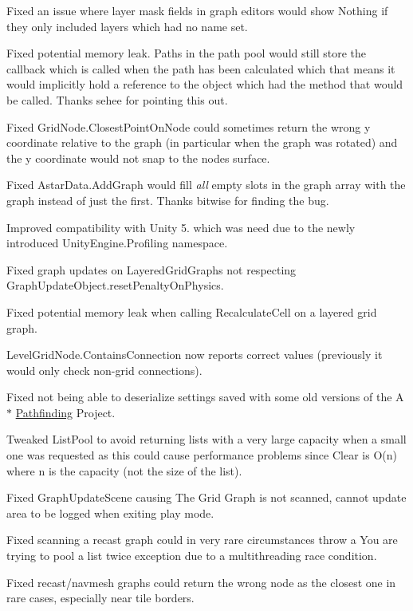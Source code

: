 \begin{DoxyItemize}
\begin{DoxyItemize}
\begin{DoxyItemize}
\item Fixed an issue where layer mask fields in graph editors would show \textquotesingle{}Nothing\textquotesingle{} if they only included layers which had no name set.
\item Fixed potential memory leak. Paths in the path pool would still store the callback which is called when the path has been calculated which that means it would implicitly hold a reference to the object which had the method that would be called. Thanks sehee for pointing this out.
\item Fixed Grid\+Node.\+Closest\+Point\+On\+Node could sometimes return the wrong y coordinate relative to the graph (in particular when the graph was rotated) and the y coordinate would not snap to the node\textquotesingle{}s surface.
\item Fixed Astar\+Data.\+Add\+Graph would fill {\itshape all} empty slots in the graph array with the graph instead of just the first. Thanks bitwise for finding the bug.
\item Improved compatibility with Unity 5. which was need due to the newly introduced Unity\+Engine.\+Profiling namespace.
\item Fixed graph updates on Layered\+Grid\+Graphs not respecting Graph\+Update\+Object.\+reset\+Penalty\+On\+Physics.
\item Fixed potential memory leak when calling Recalculate\+Cell on a layered grid graph.
\item Level\+Grid\+Node.\+Contains\+Connection now reports correct values (previously it would only check non-\/grid connections).
\item Fixed not being able to deserialize settings saved with some old versions of the A$\ast$ \mbox{\hyperlink{namespace_pathfinding}{Pathfinding}} Project.
\item Tweaked List\+Pool to avoid returning lists with a very large capacity when a small one was requested as this could cause performance problems since Clear is O(n) where n is the capacity (not the size of the list).
\item Fixed Graph\+Update\+Scene causing \textquotesingle{}The Grid Graph is not scanned, cannot update area\textquotesingle{} to be logged when exiting play mode.
\item Fixed scanning a recast graph could in very rare circumstances throw a \textquotesingle{}You are trying to pool a list twice\textquotesingle{} exception due to a multithreading race condition.
\item Fixed recast/navmesh graphs could return the wrong node as the closest one in rare cases, especially near tile borders.

\end{DoxyItemize}
\end{DoxyItemize}
\end{DoxyItemize}
